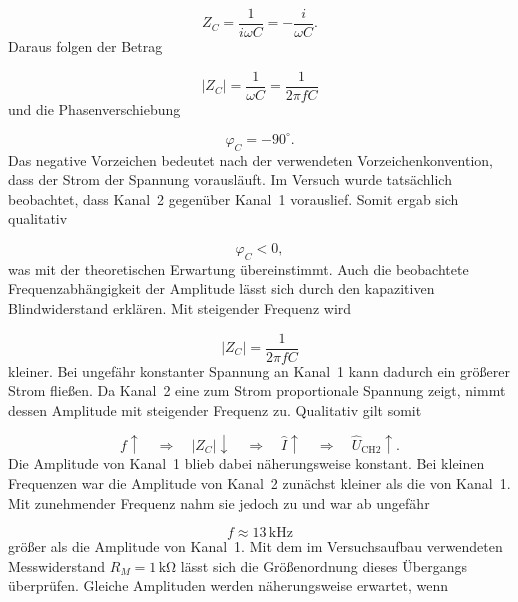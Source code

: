 \documentclass{report}
\begin{document}
\begin{equation}
Z_C=\frac{1}{i\omega C}
=-\frac{i}{\omega C}.
\end{equation}
\noindent
Daraus folgen der Betrag

\begin{equation}
|Z_C|=\frac{1}{\omega C}
=\frac{1}{2\pi f C}
\end{equation}
\noindent
und die Phasenverschiebung

\begin{equation}
\boxed{\varphi_C=-90^\circ}.
\end{equation}
\noindent
Das negative Vorzeichen bedeutet nach der verwendeten Vorzeichenkonvention, dass der Strom der Spannung vorausläuft.
\noindent
Im Versuch wurde tatsächlich beobachtet, dass Kanal~2 gegenüber Kanal~1 vorauslief. Somit ergab sich qualitativ

\begin{equation}
\varphi_C<0,
\end{equation}
\noindent
was mit der theoretischen Erwartung übereinstimmt.
\noindent
Auch die beobachtete Frequenzabhängigkeit der Amplitude lässt sich durch den kapazitiven Blindwiderstand erklären. Mit steigender Frequenz wird

\begin{equation}
|Z_C|=\frac{1}{2\pi fC}
\end{equation}
\noindent
kleiner. Bei ungefähr konstanter Spannung an Kanal~1 kann dadurch ein größerer Strom fließen. Da Kanal~2 eine zum Strom proportionale Spannung zeigt, nimmt dessen Amplitude mit steigender Frequenz zu.
\noindent
Qualitativ gilt somit

\begin{equation}
f\uparrow
\quad\Rightarrow\quad
|Z_C|\downarrow
\quad\Rightarrow\quad
\hat I\uparrow
\quad\Rightarrow\quad
\hat U_{\mathrm{CH2}}\uparrow.
\end{equation}
\noindent
Die Amplitude von Kanal~1 blieb dabei näherungsweise konstant. Bei kleinen Frequenzen war die Amplitude von Kanal~2 zunächst kleiner als die von Kanal~1. Mit zunehmender Frequenz nahm sie jedoch zu und war ab ungefähr

\begin{equation}
f\approx13\,\mathrm{kHz}
\end{equation}
\noindent
größer als die Amplitude von Kanal~1.
\noindent
Mit dem im Versuchsaufbau verwendeten Messwiderstand $R_M=1\,\mathrm{k\Omega}$ lässt sich die Größenordnung dieses Übergangs überprüfen. Gleiche Amplituden werden näherungsweise erwartet, wenn
\end{document}
